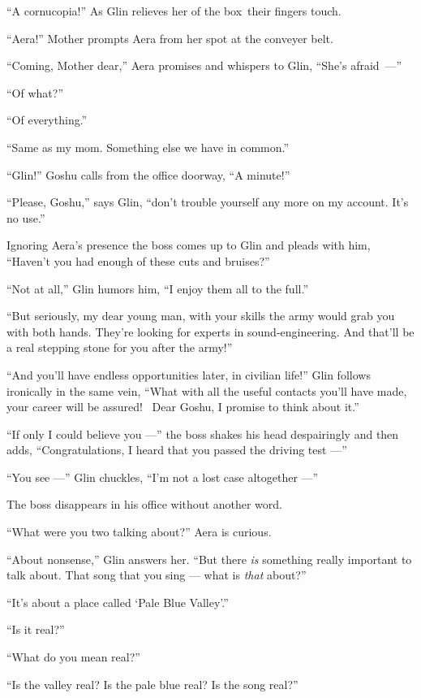 \documentclass[twoside,11pt,openany]{book}
\begin{document}
``A cornucopia!'' As Glin relieves her of the box~their fingers touch.

``Aera!'' Mother prompts Aera from her spot at the conveyer belt.

``Coming, Mother dear,'' Aera promises and whispers to Glin, ``She's \hbox{afraid ---''}

``Of what?''

``Of everything.''

``Same as my mom. Something else we have in common.''

``Glin!'' Goshu calls from the office doorway, ``A minute!''

``Please, Goshu,'' says Glin, ``don't trouble yourself any more on my account.
It's no use.''

Ignoring Aera's presence the boss comes up to Glin and pleads with him, ``Haven't you had enough of these
cuts and bruises?''

``Not at all,'' Glin humors him, ``I enjoy them all to the full.''

``But seriously, my dear young man, with your skills the army would grab you with both hands. They're
looking for experts in sound-engineering. And that'll be a real stepping stone for you after the army!''

``And you'll have endless opportunities later, in civilian life!''  Glin follows
ironically{ }in the same vein, ``What with all the useful contacts you'll have made, your
career will be assured! ~Dear Goshu, I promise to think about it.''

``If only I could believe you ---'' the boss shakes his head despairingly and
then adds, ``Congratulations, I heard that you passed the driving test ---''

``You see ---'' Glin chuckles, ``I'm not a lost case altogether ---''

The boss disappears in his office without another word.

{ }``What were you two talking about?'' Aera is curious.

``About nonsense,'' Glin answers her. ``But there \textit{is} something really
important to talk about. That song that you sing --- what is \textit{that} about?''

``It's about a place called `Pale Blue Valley'.''

``Is it real?''

``What do you mean real?''

``Is the valley real? Is the pale blue real? Is the song real?''
\end{document}
